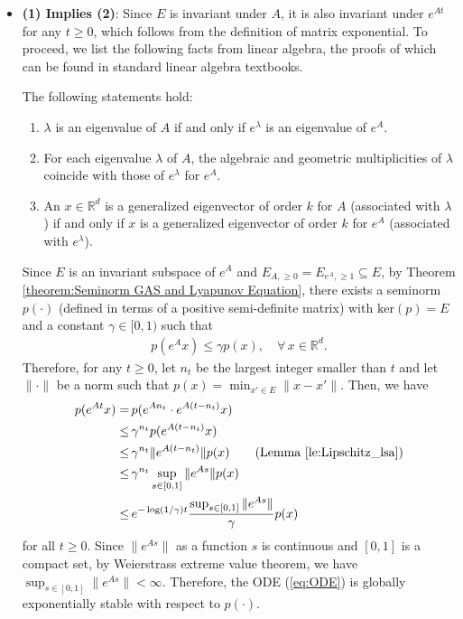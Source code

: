 \documentclass[11 pt]{article}
\begin{document}
	\begin{itemize}
		\item \textbf{(1) Implies (2)}: Since $E$ is invariant under $A$, it is also invariant under $e^{At}$ for any $t\geq 0$, which follows from the definition of matrix exponential. To proceed, we list the following facts from linear algebra, the proofs of which can be found in standard linear algebra textbooks.
		\begin{fact}\label{Fact1}
			The following statements hold:
			\begin{enumerate}[(1)]
				\item  $\lambda$ is an eigenvalue of $A$ if and only if $e^\lambda$ is an eigenvalue of $e^A$.
				\item  For each eigenvalue $\lambda$ of $A$, the algebraic and geometric multiplicities of $\lambda$ coincide with those of $e^\lambda$ for $e^A$.
				\item  An $x\in\mathbb{R}^d$ is a generalized eigenvector of order $k$ for $A$ (associated with $\lambda$) if and only if $x$ is a generalized eigenvector of order $k$ for $e^A$ (associated with $e^\lambda$).  
			\end{enumerate}
		\end{fact}
		
		Since $E$ is an invariant subspace of $e^A$ and $E_{A,\geq 0}=E_{e^{A},\geq 1}\subseteq E$, by Theorem \ref{theorem:Seminorm GAS and Lyapunov Equation}, there exists a seminorm $p(\cdot)$ (defined in terms of a positive semi-definite matrix) with $\text{ker}(p)=E$ and a constant $\gamma\in [0,1)$ such that
		\begin{align*}
			p(e^{A}x)\leq \gamma p(x),\quad\forall\,x\in\mathbb{R}^d.
		\end{align*}
		Therefore, for any $t\geq 0$, let $n_t$ be the largest integer smaller than $t$ and let $\|\cdot\|$ be a norm such that $p(x)=\min_{x'\in E}\|x-x'\|$. Then, we have
		\begin{align*}
			p(e^{At}x)=\,&p(e^{A n_t} \cdot e^{A(t-n_t)}x)\\
			\leq \,& \gamma^{n_t}p(e^{A(t-n_t)}x)\\
			\leq \,&\gamma^{n_t}\|e^{A(t-n_t)}\|p(x)\tag{Lemma \ref{le:Lipschitz_lsa}}\\
			\leq \,&\gamma^{n_t}\sup_{s \in [0,1]}\|e^{As}\|p(x)\\
			\leq \,&e^{-\log(1/\gamma) t}\frac{\sup_{s \in [0,1]}\|e^{As}\|}{\gamma }p(x)
		\end{align*}
		for all $t\geq 0$. Since $\|e^{As}\|$ as a function $s$ is continuous and $[0,1]$ is a compact set, by Weierstrass extreme value theorem, we have $\sup_{s \in [0,1]}\|e^{As}\|<\infty$. Therefore, the ODE (\ref{eq:ODE}) is globally exponentially stable with respect to $p(\cdot)$.
		

\end{itemize}
\end{document}
